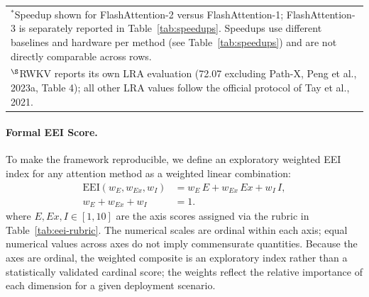 \documentclass[10pt,twocolumn]{article}
\begin{document}
\begin{table}[!tbp]
{\begin{tabular}{p{2.5cm}c c c c c}
\multicolumn{6}{p{10cm}}{\scriptsize $^*$Speedup shown for FlashAttention-2 versus FlashAttention-1; FlashAttention-3 is separately reported in Table~\ref{tab:speedups}. Speedups use different baselines and hardware per method (see Table~\ref{tab:speedups}) and are not directly comparable across rows.}\\
\multicolumn{6}{p{10cm}}{\scriptsize $^\S$RWKV reports its own LRA evaluation (72.07 excluding Path-X, Peng et al., 2023a, Table 4); all other LRA values follow the official protocol of Tay et al., 2021.}\\
\end{tabular}%
}%
\end{table}

\paragraph{Formal EEI Score.}
To make the framework reproducible, we define an exploratory weighted EEI index for any attention method as a weighted linear combination:
\begin{equation}
\begin{aligned}
\mathrm{EEI}(w_E, w_{Ex}, w_I)
  &= w_E\,E + w_{Ex}\,\mathit{Ex} + w_I\,I,\\
w_E + w_{Ex} + w_I &= 1.
\end{aligned}
\end{equation}
where $E, \mathit{Ex}, I \in [1,10]$ are the axis scores assigned via the rubric in Table~\ref{tab:eei-rubric}. The numerical scales are ordinal within each axis; equal numerical values across axes do not imply commensurate quantities. Because the axes are ordinal, the weighted composite is an exploratory index rather than a statistically validated cardinal score; the weights reflect the relative importance of each dimension for a given deployment scenario.
\end{document}
